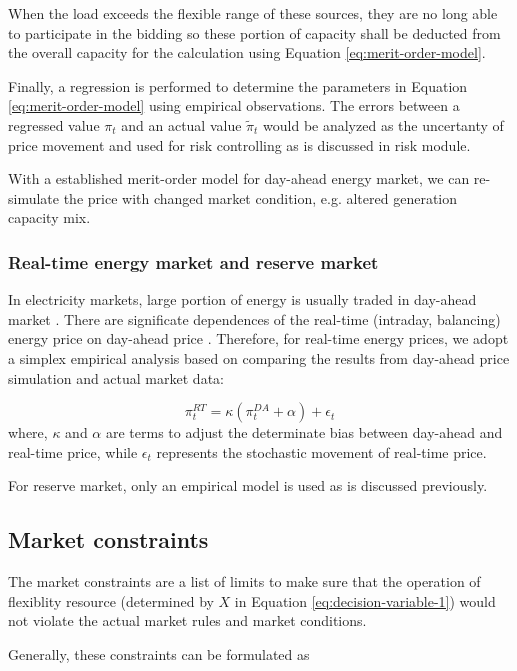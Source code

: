 When the load exceeds the flexible range of these sources, they are no long able to participate in the bidding so these portion of capacity shall be deducted from the overall capacity for the calculation using Equation \eqref{eq:merit-order-model}.

Finally, a regression is performed to determine the parameters in Equation \eqref{eq:merit-order-model} using empirical observations. The errors between a regressed value $\pi_t$ and an actual value $\tilde{\pi}_t$ would be analyzed as the uncertanty of price movement and used for risk controlling as is discussed in risk module. 

With a established merit-order model for day-ahead energy market, we can re-simulate the price with changed market condition, e.g. altered generation capacity mix.

\subsubsection{Real-time energy market and reserve market}

In electricity markets, large portion of energy is usually traded in day-ahead market \cite{Kardakos2013}. There are significate dependences of the real-time (intraday, balancing) energy price on day-ahead price \cite{Woo2016}. Therefore, for real-time energy prices, we adopt a simplex empirical analysis based on comparing the results from day-ahead price simulation and actual market data:

\begin{equation}
\pi^{RT}_t = \kappa (\pi^{DA}_t + \alpha) + \epsilon_t
\end{equation}
where, $\kappa$ and $\alpha$ are terms to adjust the determinate bias between day-ahead and real-time price, while $\epsilon_t$ represents the stochastic movement of real-time price. 

For reserve market, only an empirical model is used as is discussed previously.

\subsection{Market constraints}

The market constraints are a list of limits to make sure that the operation of flexiblity resource (determined by $X$ in Equation \eqref{eq:decision-variable-1}) would not violate the actual market rules and market conditions.

Generally, these constraints can be formulated as

